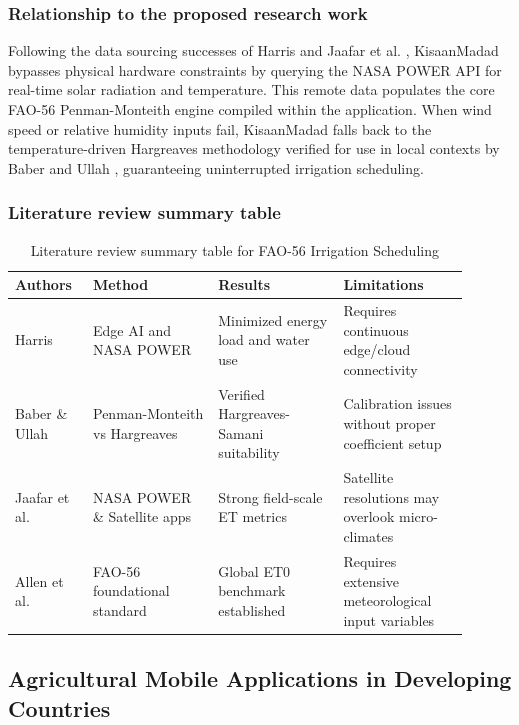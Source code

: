 \documentclass{FastFyp}
\begin{document}
\subsubsection{Relationship to the proposed research work}
Following the data sourcing successes of Harris \cite{harris2025energy} and Jaafar et al. \cite{jaafar2022agsat}, KisaanMadad bypasses physical hardware constraints by querying the NASA POWER API for real-time solar radiation and temperature. This remote data populates the core FAO-56 Penman-Monteith engine \cite{allen1998crop} compiled within the application. When wind speed or relative humidity inputs fail, KisaanMadad falls back to the temperature-driven Hargreaves methodology verified for use in local contexts by Baber and Ullah \cite{baber2024short}, guaranteeing uninterrupted irrigation scheduling.

\subsubsection{Literature review summary table}
\begin{table}[htbp]
  \centering
  \caption{Literature review summary table for FAO-56 Irrigation Scheduling}
  \label{tab:irrigation}
  \begin{tabular}{p{0.15\linewidth} p{0.25\linewidth} p{0.25\linewidth} p{0.25\linewidth}}
    \toprule
    \textbf{Authors} & \textbf{Method} & \textbf{Results} & \textbf{Limitations} \\
    \midrule
    Harris \cite{harris2025energy} & Edge AI and NASA POWER & Minimized energy load and water use & Requires continuous edge/cloud connectivity \\
    Baber \& Ullah \cite{baber2024short} & Penman-Monteith vs Hargreaves & Verified Hargreaves-Samani suitability & Calibration issues without proper coefficient setup \\
    Jaafar et al. \cite{jaafar2022agsat} & NASA POWER \& Satellite apps & Strong field-scale ET metrics & Satellite resolutions may overlook micro-climates \\
    Allen et al. \cite{allen1998crop} & FAO-56 foundational standard & Global ET0 benchmark established & Requires extensive meteorological input variables \\
    \bottomrule
  \end{tabular}
\end{table}

\subsection{Agricultural Mobile Applications in Developing Countries}
\end{document}
